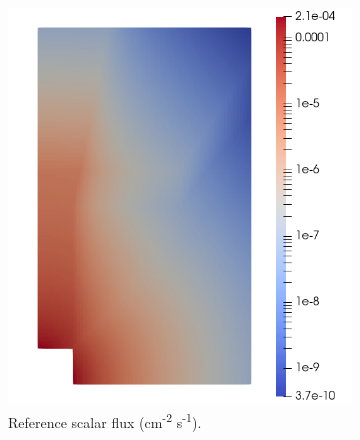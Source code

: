 \begin{figure}[H]
    \centering
    \begin{subfigure}[b]{0.47\textwidth}
        \centering
        \includegraphics[width=\textwidth]{images/verification/sasf_kobayashi/rt_z5.png}
        \caption{Reference scalar flux (cm\textsuperscript{-2} s\textsuperscript{-1}).}
        \label{fig:verification:sasf:ref_z5}
    \end{subfigure}
    \hfill
    \begin{subfigure}[b]{0.47\textwidth}
        \centering

\end{subfigure}
\end{figure}
